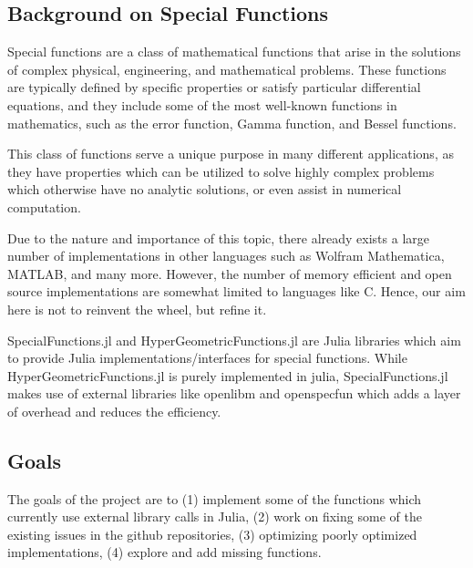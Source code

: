 \documentclass{article}
\theoremstyle{mytheoremstyle}
\theoremstyle{mytheoremstyle}
\theoremstyle{myproblemstyle}
\begin{document}
    \subsection*{Background on Special Functions}\label{sub:Background } %
   Special functions are a class of mathematical functions that arise in the solutions of complex physical, engineering, and mathematical problems.
   These functions are typically defined by specific properties or satisfy particular differential equations, and they include some of the most well-known functions in mathematics, such as the error function, Gamma function, and Bessel functions.

   This class of functions serve a unique purpose in many different applications, as they have properties which can be utilized to solve highly complex problems which otherwise have no analytic solutions, or even assist in numerical computation.


    Due to the nature and importance of this topic, there already exists a large number of implementations in other languages such as Wolfram Mathematica, MATLAB, and many more.
    However, the number of memory efficient and open source implementations are somewhat limited to languages like C. 
    Hence, our aim here is not to reinvent the wheel, but refine it. 

    SpecialFunctions.jl and HyperGeometricFunctions.jl are Julia libraries which aim to provide Julia implementations/interfaces for special functions.
    While HyperGeometricFunctions.jl is purely implemented in julia, SpecialFunctions.jl makes use of external libraries like openlibm and openspecfun which adds a layer of overhead and reduces the efficiency.



    
    \subsection*{Goals}\label{sub:Goals} %
      The goals of the project are to (1) implement some of the functions which currently use external library calls in Julia, (2) work on fixing some of the existing issues in the github repositories, (3) optimizing poorly optimized implementations, (4) explore and add missing functions. 
\end{document}
